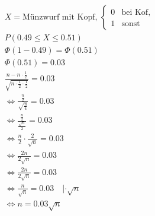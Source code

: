 \begin{align*}
    X = \text{Münzwurf mit Kopf, } \begin{cases}
                                       0 & \text{bei Kof, } \\
                                       1 & \text{sonst}
                                   \end{cases} \\
    P(0.49 \leq X \leq 0.51)                            \\
    \Phi(1 - 0.49) = \Phi(0.51)                         \\
    \Phi(0.51) = 0.03                                   \\
    \frac{n - n \cdot \frac{1}{2}}{\sqrt{n \cdot \frac{1}{2} \cdot \frac{1}{2}}} = 0.03\\
    \Leftrightarrow \frac{\frac{n}{2}}{\sqrt{\frac{n}{4}}} = 0.03 \\
    \Leftrightarrow \frac{\frac{n}{2}}{\frac{\sqrt{n}}{2}} = 0.03 \\
    \Leftrightarrow \frac{n}{2} \cdot \frac{2}{\sqrt{n}} = 0.03 \\
    \Leftrightarrow \frac{2n}{2\sqrt{n}} = 0.03 \\
    \Leftrightarrow \frac{2n}{2\sqrt{n}} = 0.03 \\
    \Leftrightarrow \frac{n}{\sqrt{n}} = 0.03 \quad | \cdot \sqrt{n} \\
    \Leftrightarrow n = 0.03\sqrt{n}\\
\end{align*}